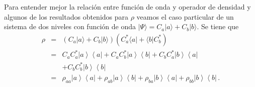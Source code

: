 \documentclass[twocolumn,aps,eqsecnum]{revtex4}
\providecommand{\bra}[1]{\langle #1 \rvert}
\providecommand{\ket}[1]{\lvert #1 \rangle}
\newcommand{\ketbra}[2]{\left| {#1} \right\rangle\left\langle {#2}\right|}
\begin{document}
Para entender mejor la relaci\'on entre funci\'on de onda y operador de 
densidad y algunos de los resultados obtenidos para $\rho$ veamos el caso 
particular de un sistema de dos niveles con funci\'on de onda 
$\ket{\Psi} = C_a \ket{a} +C_b \ket{b}$.  Se tiene que 
%
\begin{eqnarray}
\rho &=& \left( C_a \ket{a} +C_b \ket{b} \right) 
	\left( C_a^\ast \bra{a} + \bra{b} C_b^\ast  \right)  	\nonumber \\ 
&=& C_a C_a^{\ast} \ketbra{a}{a} + C_a C_b^{\ast} \ketbra{a}{b} 
	+C_b C_a^{\ast} \ketbra{b}{a}  		\nonumber \\ 
	&& + C_b C_b^{\ast}\ketbra{b}{b} 		\nonumber \\ 
&=& \rho_{aa}  \ketbra{a}{a} +  \rho_{ab}  \ketbra{a}{b}  
	+  \rho_{ba} \ketbra{b}{a}  + \rho_{bb}  \ketbra{b}{b}  \,. \nonumber \\
\end{eqnarray}
\end{document}
